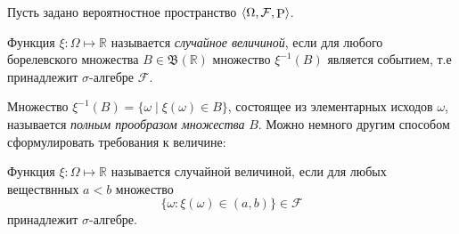 Пусть задано вероятностное пространство $\langle \Omega, \mathcal F, \P \rangle$.

\begin{to_def}
    Функция $\xi \colon  \Omega \mapsto \mathbb{R}$ называется \textit{случайное величиной}, если для любого борелевского множества $B \in \mathfrak B (\mathbb{R})$ множество $\xi^{-1} (B)$ является событием, т.е принадлежит $\sigma$-алгебре $\mathcal F$. 
\end{to_def}

Множество $\xi^{-1} (B) = \{ \omega \mid \xi(\omega) \in B\}$, состоящее из элементарных исходов $\omega$, называется \textit{полным прообразом множества} $B$. Можно немного другим способом сформулировать требования к величине:

\begin{to_def}
    Функция $\xi \colon  \Omega \mapsto \mathbb{R}$ называется случайной величиной, если для любых веществнных $a < b$ множество $$\{\omega \colon  \xi(\omega) \in (a, b)\} \in \mathcal F$$
    принадлежит $\sigma$-алгебре.
\end{to_def}